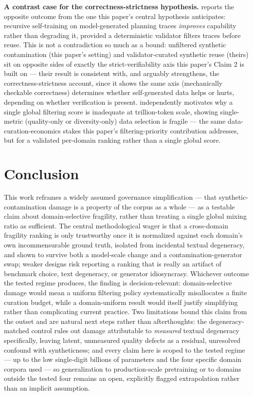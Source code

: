 \documentclass[11pt]{article}
\begin{document}
\textbf{A contrast case for the correctness-strictness hypothesis.} \citet{IterativeDeploymentImpro} reports the opposite outcome from the one this paper's central hypothesis anticipates: recursive self-training on model-generated planning traces \emph{improves} capability rather than degrading it, provided a deterministic validator filters traces before reuse. This is not a contradiction so much as a bound: unfiltered synthetic contamination (this paper's setting) and validator-curated synthetic reuse (theirs) sit on opposite sides of exactly the strict-verifiability axis this paper's Claim 2 is built on --- their result is consistent with, and arguably strengthens, the correctness-strictness account, since it shows the same axis (mechanically checkable correctness) determines whether self-generated data helps or hurts, depending on whether verification is present. \citet{JointSelectionLarge} independently motivates why a single global filtering score is inadequate at trillion-token scale, showing single-metric (quality-only or diversity-only) data selection is fragile --- the same data-curation-economics stakes this paper's filtering-priority contribution addresses, but for a validated per-domain ranking rather than a single global score.

\section{Conclusion}

This work reframes a widely assumed governance simplification --- that synthetic-contamination damage is a property of the corpus as a whole --- as a testable claim about domain-selective fragility, rather than treating a single global mixing ratio as sufficient. The central methodological wager is that a cross-domain fragility ranking is only trustworthy once it is normalized against each domain's own incommensurable ground truth, isolated from incidental textual degeneracy, and shown to survive both a model-scale change and a contamination-generator swap; weaker designs risk reporting a ranking that is really an artifact of benchmark choice, text degeneracy, or generator idiosyncrasy. Whichever outcome the tested regime produces, the finding is decision-relevant: domain-selective damage would mean a uniform filtering policy systematically misallocates a finite curation budget, while a domain-uniform result would itself justify simplifying rather than complicating current practice. Two limitations bound this claim from the outset and are natural next steps rather than afterthoughts: the degeneracy-matched control rules out damage attributable to \emph{measured} textual degeneracy specifically, leaving latent, unmeasured quality defects as a residual, unresolved confound with syntheticness; and every claim here is scoped to the tested regime --- up to the low single-digit billions of parameters and the four specific domain corpora used --- so generalization to production-scale pretraining or to domains outside the tested four remains an open, explicitly flagged extrapolation rather than an implicit assumption.
\end{document}
